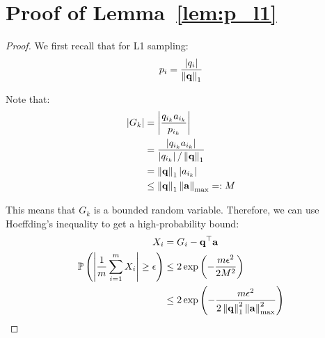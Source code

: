 \section{Proof of Lemma~\ref{lem:p_l1}}
\label{sec:proof-lem_p_l1}
\vspace{-5pt}
\begin{proof}
% 
% 
We first recall that for L1 sampling:
$$ p_i = \frac{ \left\vert q_{i} \right\vert}{\left\Vert \mathbf{q} \right\Vert_1} $$

Note that:
\begin{align*}
\left\vert G_k \right\vert &= \left\vert \frac{q_{i_k} a_{i_k}}{p_{i_k}} \right\vert \\
&= \frac{ \left\vert q_{i_k} a_{i_k} \right\vert}{\left\vert q_{i_k} \right\vert/ \left\Vert \mathbf{q} \right\Vert_1 } \\
&=  \left\Vert \mathbf{q} \right\Vert_1 \left\vert a_{i_k} \right\vert \\
&\leq \left\Vert \mathbf{q} \right\Vert_1 \left\Vert \mathbf{a} \right\Vert_{\max} =: M
\end{align*}

This means that $G_k$ is a bounded random variable. %
Therefore, we can use Hoeffding's inequality to get a high-probability bound:
\begin{align*}
X_i &= G_i - \vq^\top \va \\
\Pr \left( \lv \frac{1}{m} \sum_{i=1}^m  X_i \rv \geq \epsilon \right) %
&\leq 2 \exp \left(- \frac{ m \epsilon^2}{2 M^2} \right) \\
&\leq 2 \exp \left(- \frac{ m \epsilon^2}{2 \lV \vq \rV_1^2 \lV \va \rV_{\max}^2} \right)
\end{align*}


\end{proof}
